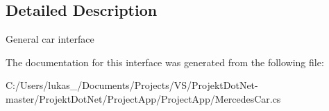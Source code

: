 \subsection{Detailed Description}
General car interface 



The documentation for this interface was generated from the following file\+:\begin{DoxyCompactItemize}
\item 
C\+:/\+Users/lukas\+\_/\+Documents/\+Projects/\+V\+S/\+Projekt\+Dot\+Net-\/master/\+Projekt\+Dot\+Net/\+Project\+App/\+Project\+App/Mercedes\+Car.\+cs\end{DoxyCompactItemize}
